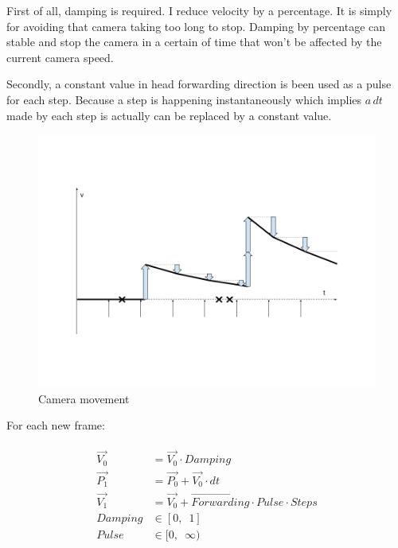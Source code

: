 First of all, damping is required. I reduce velocity by a percentage. It is simply for avoiding that camera taking too long to stop. Damping by percentage can stable and stop the camera in a certain of time that won't be affected by the current camera speed. 

Secondly, a constant value in head forwarding direction is been used as a pulse for each step. Because a step is happening instantaneously which implies $a\,dt$ made by each step is actually can be replaced by a constant value.

\begin{figure}[H]
\caption{Camera movement}
\label{fig:camera-movement}
\centering
\includegraphics[width=\linewidth]{Figures/camera-movement.png}
\decoRule
\end{figure}

For each new frame:

\[
\begin{array}{lr}
\begin{aligned}
\overrightarrow{V_0} &= \overrightarrow{V_0} \cdot Damping\\
\overrightarrow{P_1} &= \overrightarrow{P_0} + \overrightarrow{V_0} \cdot dt\\
\overrightarrow{V_1} &= \overrightarrow{V_0} + \overrightarrow{Forwarding} \cdot Pulse \cdot Steps\\
Damping &\in [0,\enspace1]\\
Pulse &\in [0,\enspace \infty)\\
\end{aligned}
\end{array}
\]

